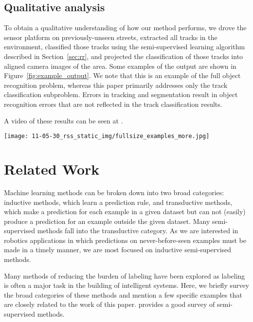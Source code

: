 \documentclass[conference]{IEEEtran}
\begin{document}
\subsection{Qualitative analysis}
\label{sec:qual}
To obtain a qualitative understanding of how our method performs, we drove the sensor platform on previously-unseen streets, extracted all tracks in the environment, classified those tracks using the semi-supervised learning algorithm described in Section~\ref{sec:rr}, and projected the classification of those tracks into aligned camera images of the area.  Some examples of the output are shown in Figure~\ref{fig:example_output}.  We note that this is an example of the full object recognition problem, whereas this paper primarily addresses only the track classification subproblem.  Errors in tracking and segmentation result in object recognition errors that are not reflected in the track classification results.

A video of these results can be seen at \cite{video}.

\begin{figure*}
  \centering
  \texttt{[image: 11-05-30\_rss\_static\_img/fullsize\_examples\_more.jpg]}
  \caption{Track classifications in LIDAR data projected into aligned camera data for visualization.  Best viewed in color.  Cars are outlined in red, pedestrians in blue, bicyclists in green, and background in gray.  Objects without outlines were not tracked.  Tracking and segmentation errors (beyond the scope of this paper) are the major cause of failures.  A video of these results can be seen at \cite{video}.}
  \label{fig:example_output}
\end{figure*}


\section{Related Work}

Machine learning methods can be broken down into two broad categories: inductive methods, which learn a prediction rule, and transductive methods, which make a prediction for each example in a given dataset but can not (easily) produce a prediction for an example outside the given dataset.  Many semi-supervised methods fall into the transductive category.  As we are interested in robotics applications in which predictions on never-before-seen examples must be made in a timely manner, we are most focused on inductive semi-supervised methods.

Many methods of reducing the burden of labeling have been explored as labeling is often a major task in the building of intelligent systems.  Here, we briefly survey the broad categories of these methods and mention a few specific examples that are closely related to the work of this paper.  \citet{Zhu2007} provides a good survey of semi-supervised methods.
\end{document}
